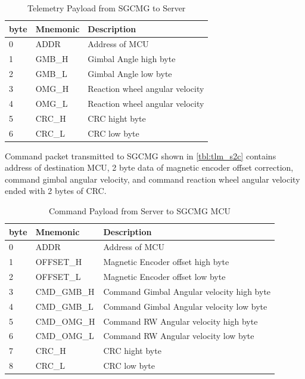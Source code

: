 \begin{table}[!h]
        \centering
\begin{tabular}{|p{}|p{}|p{}|}
\hline 
 byte & Mnemonic & Description \\
\hline 
 0 & ADDR & Address of MCU \\
\hline 
 1 & GMB\_H & Gimbal Angle high byte \\
\hline 
 2 & GMB\_L & Gimbal Angle low byte \\
\hline 
 3 & OMG\_H & Reaction wheel angular velocity \\
\hline 
 4 & OMG\_L & Reaction wheel angular velocity \\
\hline 
 5 & CRC\_H & CRC hight byte \\
\hline 
 6 & CRC\_L & CRC low byte \\
 \hline
\end{tabular}
        \caption{Telemetry Payload from SGCMG to Server}
        \label{tbl:tlm_c2s}
        \end{table}
\noindent Command packet transmitted to SGCMG shown in \autoref{tbl:tlm_s2c} contains address of destination MCU, 2 byte data of magnetic encoder offset correction, command gimbal angular velocity, and command reaction wheel angular velocity ended with 2 bytes of CRC.
\begin{table}[!h]
        \centering
\begin{tabular}{|p{}|p{}|p{}|}
\hline 
 byte & Mnemonic & Description \\
\hline 
 0 & ADDR & Address of MCU \\
\hline 
 1 & OFFSET\_H & Magnetic Encoder offset high byte \\
\hline 
 2 & OFFSET\_L & Magnetic Encoder offset low byte \\
\hline 
 3 & CMD\_GMB\_H & Command Gimbal Angular velocity high byte \\
\hline 
 4 & CMD\_GMB\_L & Command Gimbal Angular velocity low byte \\
\hline 
 5 & CMD\_OMG\_H & Command RW Angular velocity high byte \\
\hline 
 6 & CMD\_OMG\_L & Command RW Angular velocity low byte \\
\hline 
 7 & CRC\_H & CRC hight byte \\
\hline 
 8 & CRC\_L & CRC low byte \\
 \hline
\end{tabular}
        \caption{Command Payload from Server to SGCMG MCU}
        \label{tbl:tlm_s2c}
        \end{table}
        
